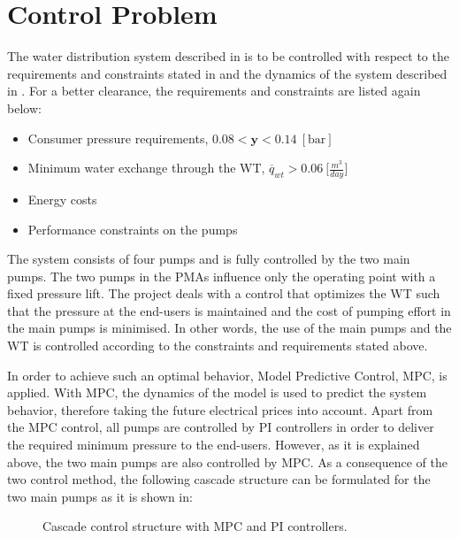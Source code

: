 \section{Control Problem}
\label{control_problem}
The water distribution system described in  is to be controlled with respect to the requirements and constraints stated in  and the dynamics of the system described in . For a better clearance, the requirements and constraints are listed again below: 
\begin{itemize}
	\item Consumer pressure requirements, $0.08 < \pmb{y} < 0.14 \:[\text{bar}]$
%
	\item Minimum water exchange through the WT, $\overline{q}_{wt} > 0.06 \: \big[\frac{m^3}{day}\big]$
%
	\item Energy costs 
%
	\item Performance constraints on the pumps
\end{itemize}
The system consists of four pumps and is fully controlled by the two main pumps. The two pumps in the PMAs influence only the operating point with a fixed pressure lift. The project deals with a control that optimizes the WT such that the pressure at the end-users is maintained and the cost of pumping effort in the main pumps is minimised. In other words, the use of the main pumps and the WT is controlled according to the constraints and requirements stated above. 

In order to achieve such an optimal behavior, Model Predictive Control, MPC, is applied. With MPC, the dynamics of the model is used to predict the system behavior, therefore taking the future electrical prices into account. Apart from the MPC control, all pumps are controlled by PI controllers in order to deliver the required minimum pressure to the end-users. However, as it is explained above, the two main pumps are also controlled by MPC. As a consequence of the two control method, the following cascade structure can be formulated for the two main pumps as it is shown in: 

\begin{figure}[H]
\centering
 
\caption{Cascade control structure with MPC and PI controllers.}
\label{fig:control_structure}
\end{figure}


